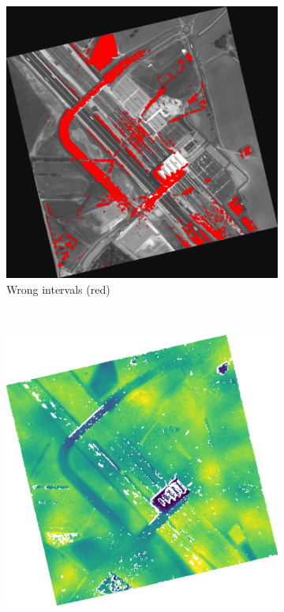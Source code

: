 \begin{figure}[ht!]
\begin{subfigure}[t]{0.4\linewidth}
        \includegraphics[width=\linewidth]{Images/Chap_5/img_error_MTP_278_err.png}
        \caption{Wrong intervals (red)}
        \label{fig:mtp_278_b}
    \end{subfigure}\\
    \begin{subfigure}[t]{0.4\linewidth}
        \centering
        \includegraphics[width=\linewidth]{Images/Chap_5/img_error_MTP_278_disp.png}

\end{subfigure}
\end{figure}
